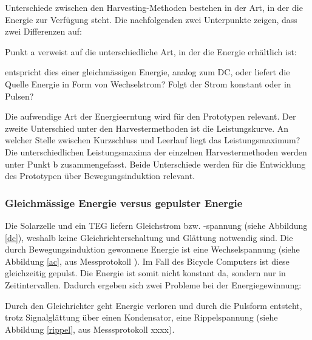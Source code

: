 
Unterschiede zwischen den Harvesting-Methoden bestehen in der Art, in der die Energie zur Verfügung steht. Die nachfolgenden zwei Unterpunkte zeigen, dass zwei Differenzen auf: 

Punkt a verweist auf die unterschiedliche Art, in der die Energie erhältlich ist:

entspricht dies einer gleichmässigen Energie, analog zum DC, oder liefert die Quelle Energie in Form von Wechselstrom? Folgt der Strom konstant oder in Pulsen?

Die aufwendige Art  der Energieerntung wird für den Prototypen relevant.  Der zweite Unterschied unter den Harvestermethoden ist die Leistungskurve. An welcher Stelle zwischen Kurzschluss  und Leerlauf liegt das Leistungsmaximum? Die unterschiedlichen Leistungsmaxima der einzelnen Harvestermethoden werden unter Punkt b zusammengefasst. Beide Unterschiede werden für die Entwicklung des Prototypen über Bewegungsinduktion relevant.

\subsubsection{Gleichmässige Energie versus gepulster Energie}


Die Solarzelle und ein TEG liefern Gleichstrom bzw. -spannung (siehe Abbildung \ref{dc}), weshalb keine Gleichrichterschaltung und Glättung notwendig sind. Die durch Bewegungsinduktion gewonnene Energie ist eine Wechselspannung (siehe Abbildung \ref{ac}, aus Messprotokoll \cite{messung_opt_spule}). Im Fall des Bicycle Computers ist diese gleichzeitig gepulst.  Die Energie ist somit nicht konstant da, sondern nur in Zeitintervallen. Dadurch ergeben sich zwei Probleme bei der Energiegewinnung: 

Durch den Gleichrichter geht Energie verloren und durch die Pulsform entsteht, trotz Signalglättung über einen Kondensator, eine Rippelspannung (siehe Abbildung \ref{rippel}, aus Messsprotokoll xxxx). 

